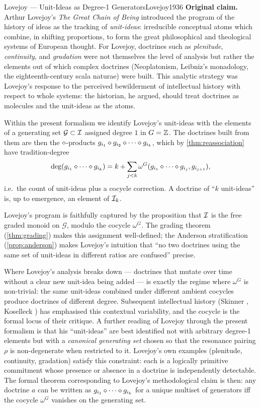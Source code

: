 \begin{zooentry}{Lovejoy --- Unit-Ideas as Degree-1 Generators}{Lovejoy1936}
\textbf{Original claim.} Arthur Lovejoy's \emph{The Great Chain of
Being} \cite{Lovejoy1936} introduced the program of the history of
ideas as the tracking of \emph{unit-ideas}: irreducible conceptual
atoms which combine, in shifting proportions, to form the great
philosophical and theological systems of European thought. For
Lovejoy, doctrines such as \emph{plenitude}, \emph{continuity}, and
\emph{gradation} were not themselves the level of analysis but rather
the elements out of which complex doctrines (Neoplatonism, Leibniz's
monadology, the eighteenth-century scala naturae) were built. This
analytic strategy was Lovejoy's response to the perceived
bewilderment of intellectual history with respect to whole systems:
the historian, he argued, should treat doctrines as molecules and the
unit-ideas as the atoms.

\formalclaim Within the present formalism we identify Lovejoy's
unit-ideas with the elements of a generating set $\mathcal{G}\subset
\mathcal{I}$ assigned degree $1$ in $G=\mathbb{Z}$. The doctrines built from them
are then the $\mathbin{\diamond}$-products $g_{i_1}\mathbin{\diamond} g_{i_2}\mathbin{\diamond}
\cdots\mathbin{\diamond} g_{i_k}$, which by \cref{thm:reassociation} have
tradition-degree
\[
  \deg(g_{i_1}\mathbin{\diamond}\cdots\mathbin{\diamond} g_{i_k}) = k +
  \sum_{j<k}\omega^G(g_{i_1}\mathbin{\diamond}\cdots\mathbin{\diamond} g_{i_j}, g_{i_{j+1}}),
\]
i.e.\ the count of unit-ideas plus a cocycle correction. A doctrine of
``$k$ unit-ideas'' is, up to emergence, an element of $\mathcal{I}_k$.

\formalstatus Lovejoy's program is faithfully captured by the
proposition that $\mathcal{I}$ is the free graded monoid on $\mathcal{G}$,
modulo the cocycle $\omega^G$. The grading theorem
(\cref{thm:grading}) makes this assignment well-defined; the Anderson
stratification (\cref{prop:anderson}) makes Lovejoy's intuition that
``no two doctrines using the same set of unit-ideas in different
ratios are confused'' precise.

\litcomment Where Lovejoy's analysis breaks down --- doctrines that
mutate over time without a clear new unit-idea being added --- is
exactly the regime where $\omega^G$ is non-trivial: the same unit-ideas
combined under different ambient cocycles produce doctrines of
different degree. Subsequent intellectual history (Skinner
\cite{Skinner1969}, Koselleck \cite{Koselleck2002}) has emphasised
this contextual variability, and the cocycle is the formal locus of
their critique. A further reading of Lovejoy through the present
formalism is that his ``unit-ideas'' are best identified not with
arbitrary degree-1 elements but with a \emph{canonical generating set}
chosen so that the resonance pairing $\rho$ is non-degenerate when
restricted to it. Lovejoy's own examples (plenitude, continuity,
gradation) satisfy this constraint: each is a logically primitive
commitment whose presence or absence in a doctrine is independently
detectable. The formal theorem corresponding to Lovejoy's
methodological claim is then: any doctrine $a$ can be written as
$g_{i_1}\mathbin{\diamond}\cdots\mathbin{\diamond} g_{i_k}$ for a unique multiset of
generators iff the cocycle $\omega^G$ vanishes on the generating set.
\end{zooentry}

